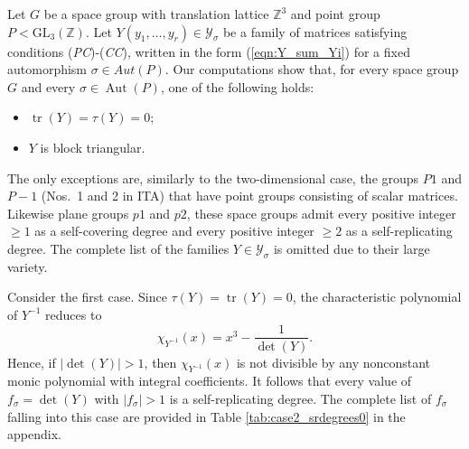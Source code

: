 \documentclass[draft]{adm-paper}
\DeclareMathOperator{\tr}{tr}
\theoremstyle{definition}
\begin{document}
Let $G$ be a space group with translation lattice $\mathbb{Z}^3$ and point group $P < \mathrm{GL}_3(\mathbb{Z})$. Let
$Y(y_1, \dots, y_r) \in \mathcal{Y}_\sigma$ be a family of matrices satisfying conditions (\textit{PC})-(\textit{CC}),
written in the form (\ref{eqn:Y_sum_Yi}) for a fixed automorphism $\sigma \in Aut(P)$. Our computations show that, for
every space group $G$ and every $\sigma\in\operatorname{Aut}(P)$, one of the following holds:
\begin{itemize}
\item[(1)] $\tr(Y)=\tau(Y)=0$;
\item[(2)] $Y$ is block triangular.
\end{itemize}
The only exceptions are, similarly to the two-dimensional case, the groups $P1$ and $P-1$ (Nos.~1 and 2 in ITA) that
have point groups consisting of scalar matrices. Likewise plane groups $p1$ and $p2$, these space groups admit every
positive integer $\ge 1$ as a self-covering degree and every positive integer $\ge 2$ as a self-replicating degree.
The complete list of the families $Y \in \mathcal{Y}_\sigma$ is omitted due to their large variety\footnotemark[1]{}.


Consider the first case. Since $\tau(Y)=\tr(Y)=0$, the characteristic polynomial of $Y^{-1}$ reduces to
\[
\chi_{Y^{-1}}(x) = x^3 - \frac{1}{\det(Y)}.
\]
Hence, if $|\det(Y)|>1$, then $\chi_{Y^{-1}}(x)$ is not divisible by any nonconstant monic polynomial with integral
coefficients. It follows that every value of $f_\sigma = \det(Y)$ with $|f_\sigma|>1$ is a self-replicating degree.
The complete list of $f_\sigma$ falling into this case are provided in Table \ref{tab:case2_srdegrees0} in the appendix.
\end{document}

